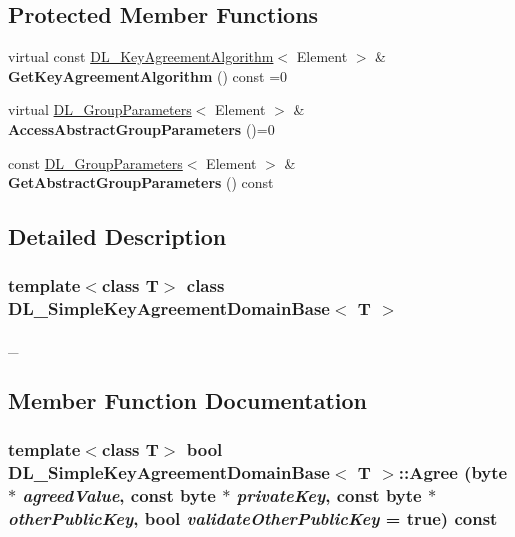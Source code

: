 \subsection*{Protected Member Functions}
\begin{DoxyCompactItemize}
\item 
\hypertarget{class_d_l___simple_key_agreement_domain_base_a06c0616d7e814878eb0ca366dd5f8ec4}{
virtual const \hyperlink{class_d_l___key_agreement_algorithm}{DL\_\-KeyAgreementAlgorithm}$<$ Element $>$ \& {\bfseries GetKeyAgreementAlgorithm} () const =0}
\label{class_d_l___simple_key_agreement_domain_base_a06c0616d7e814878eb0ca366dd5f8ec4}

\item 
\hypertarget{class_d_l___simple_key_agreement_domain_base_a6426385daba7a5690c740549b22f51d7}{
virtual \hyperlink{class_d_l___group_parameters}{DL\_\-GroupParameters}$<$ Element $>$ \& {\bfseries AccessAbstractGroupParameters} ()=0}
\label{class_d_l___simple_key_agreement_domain_base_a6426385daba7a5690c740549b22f51d7}

\item 
\hypertarget{class_d_l___simple_key_agreement_domain_base_ac77d4bfb176fd2a0b4a0517d671b76dd}{
const \hyperlink{class_d_l___group_parameters}{DL\_\-GroupParameters}$<$ Element $>$ \& {\bfseries GetAbstractGroupParameters} () const }
\label{class_d_l___simple_key_agreement_domain_base_ac77d4bfb176fd2a0b4a0517d671b76dd}

\end{DoxyCompactItemize}


\subsection{Detailed Description}
\subsubsection*{template$<$class T$>$ class DL\_\-SimpleKeyAgreementDomainBase$<$ T $>$}

\_\- 

\subsection{Member Function Documentation}
\hypertarget{class_d_l___simple_key_agreement_domain_base_aa27177cea8a872273736e593d1327157}{
\subsubsection[{Agree}]{\setlength{\rightskip}{0pt plus 5cm}template$<$class T$>$ bool {\bf DL\_\-SimpleKeyAgreementDomainBase}$<$ T $>$::Agree (byte $\ast$ {\em agreedValue}, \/  const byte $\ast$ {\em privateKey}, \/  const byte $\ast$ {\em otherPublicKey}, \/  bool {\em validateOtherPublicKey} = {\ttfamily true}) const}}
\label{class_d_l___simple_key_agreement_domain_base_aa27177cea8a872273736e593d1327157}


